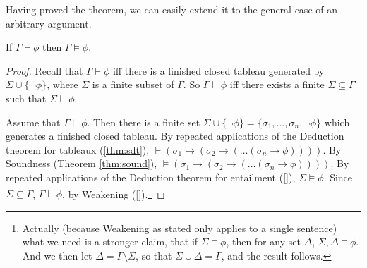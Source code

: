 Having proved the theorem, we can easily extend it to the general
case of an arbitrary argument. 

\begin{theorem}
	If $\Gamma\vdash\phi$ then $\Gamma\vDash\phi$.
\end{theorem}
\begin{proof}
	Recall that $\Gamma\vdash\phi$ iff there is a finished closed tableau generated by $\Sigma\cup\{\neg\phi\}$, where $\Sigma$ is a finite subset of $\Gamma$. So  $\Gamma\vdash\phi$ iff there exists a finite $\Sigma\subseteq\Gamma$ such that $\Sigma\vdash\phi$. 
	
	Assume that $\Gamma\vdash\phi$. Then there is a finite set $\Sigma\cup\{¬\phi\} = \{\sigma_{1},…,\sigma_{n},\neg\phi\}$ which generates a finished closed tableau. By repeated applications of the Deduction theorem for tableaux (\autoref{thm:sdt}), $\vdash (\sigma_{1} \to (\sigma_{2} \to ( … (\sigma_{n}\to\phi))))$. By Soundness (Theorem \ref{thm:sound}), $\vDash (\sigma_{1} \to (\sigma_{2} \to ( … (\sigma_{n}\to\phi))))$. By repeated applications of the Deduction theorem for entailment (\ref{}), $\Sigma \vDash\phi$. Since $\Sigma\subseteq\Gamma$, $\Gamma \vDash \phi$, by Weakening (\ref{}).\footnote{Actually (because Weakening as stated only applies to a single sentence) what we need is a stronger claim, that if $\Sigma\vDash\phi$, then for any set $\Delta$, $\Sigma,\Delta\vDash\phi$. And we then let $\Delta=\Gamma\setminus\Sigma$, so that $\Sigma\cup\Delta=\Gamma$, and the result follows.}
\end{proof}







